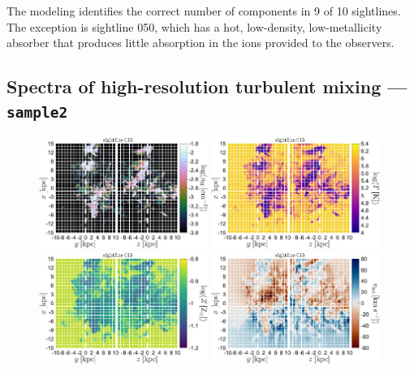 \documentclass[fleqn,usenatbib]{mnras}
\begin{document}
The modeling identifies the correct number of components in 9 of 10 sightlines.
The exception is sightline 050, which has a hot, low-density, low-metallicity absorber that produces little absorption in the ions provided to the observers.

\subsection{Spectra of high-resolution turbulent mixing --- \texttt{sample2}}
\label{s: results -- sample2}

\begin{figure}
    \centering
    \includegraphics[width=0.49\textwidth]{figures/sample2/projections/density_projection_maps_SL_15.jpg}
    \includegraphics[width=0.49\textwidth]{figures/sample2/projections/temperature_projection_maps_SL_15.jpg} \\
    \includegraphics[width=0.49\textwidth]{figures/sample2/projections/metallicity_projection_maps_SL_15.jpg}
    \includegraphics[width=0.49\textwidth]{figures/sample2/projections/velocity_projection_maps_SL_15.jpg}

\end{figure}
\end{document}
